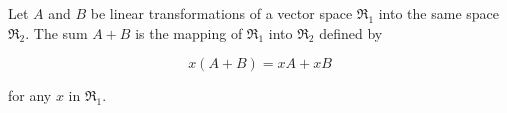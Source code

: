 Let $A$ and $B$ be linear transformations of a vector space $\mathfrak{R}_1$ into the same space $\mathfrak{R}_2$. The sum $A + B$ is the mapping of $\mathfrak{R}_1$ into $\mathfrak{R}_2$ defined by

$$x(A + B) = xA + xB$$

for any $x$ in $\mathfrak{R}_1$.
